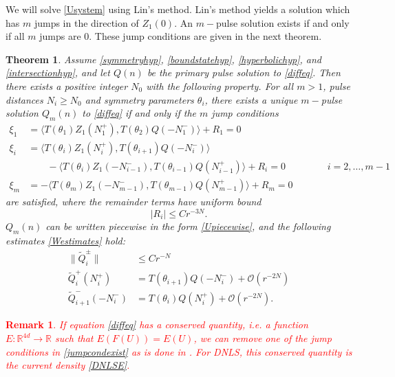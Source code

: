 \documentclass[12pt]{elsarticle}
\def\R{{\mathbb R}}
\newtheorem{theorem}{Theorem}
\newtheorem{remark}{Remark}
\newcommand{\revised}[1]{ \textcolor{red}{#1} }
\begin{document}
We will solve \cref{Usystem} using Lin's method. Lin's method yields a solution which has $m$ jumps in the direction of $Z_1(0)$. An $m-$pulse solution exists if and only if all $m$ jumps are 0. These jump conditions are given in the next theorem.

\begin{theorem}\label{ntmulti}
Assume \cref{symmetryhyp}, \cref{boundstatehyp}, \cref{hyperbolichyp}, and \cref{intersectionhyp}, and let $Q(n)$ be the primary pulse solution to \cref{diffeq}. Then there exists a positive  integer $N_0$ with the following property. For all $m > 1$, pulse distances $N_i \geq N_0$ and symmetry parameters $\theta_i$, there exists a unique $m-$pulse solution $Q_m(n)$ to \cref{diffeq} if and only if the $m$ jump conditions 
\begin{equation}\label{jumpcondexist}
\begin{aligned}
\xi_1 &= \langle T(\theta_1) Z_1(N_1^+), T(\theta_{2}) Q(-N_1^-) \rangle + R_1 = 0 \\
\xi_i &= \langle T(\theta_i) Z_1(N_i^+), T(\theta_{i+1}) Q(-N_i^-) \rangle \\
&\qquad-\langle T(\theta_i) Z_1(-N_{i-1}^-), T(\theta_{i-1}) Q(N_{i-1}^+) \rangle + R_i = 0 && \qquad i = 2, \dots, m-1 \\
\xi_m &= -\langle T(\theta_m) Z_1(-N_{m-1}^-), T(\theta_{m-1}) Q(N_{m-1}^+) \rangle + R_m = 0
\end{aligned}
\end{equation}
are satisfied, where the remainder terms have uniform bound
\[
|R_i| \leq C r^{-3N}.
\]
$Q_m(n)$ can be written piecewise in the form \cref{Upiecewise}, and the following estimates \cref{Westimates} hold:
\begin{equation}\label{Westimates}
\begin{aligned}
\|\tilde{Q}_i^\pm\| &\leq C r^{-N} \\
\tilde{Q}_i^+(N_i^+) &= T(\theta_{i+1}) Q(-N_i^-) + \mathcal{O}(r^{-2N}) \\
\tilde{Q}_{i+1}^-(-N_i^-) &= T(\theta_i) Q(N_i^+) + \mathcal{O}(r^{-2N}) .
\end{aligned}
\end{equation}
\end{theorem}

\revised{
\begin{remark}If equation \cref{diffeq} has a conserved quantity, i.e. a function $E: \R^{4d} \rightarrow \R$ such that $E(F(U)) = E(U)$, we can remove one of the jump conditions in \cref{jumpcondexist} as is done in \cite{SandstedeStrut}. For DNLS, this conserved quantity is the current density \cref{DNLSE}.
\end{remark}
}
\end{document}
